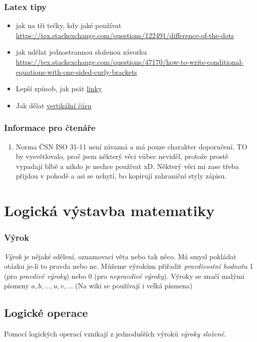 \documentclass[12pt]{article}
\begin{document}
\subsubsection{Latex tipy}
\begin{itemize}
\item jak na tři tečky, kdy jaké používat \url{https://tex.stackexchange.com/questions/122491/difference-of-the-dots}
\item jak udělat jednostrannou složenou závorku \url{https://tex.stackexchange.com/questions/47170/how-to-write-conditional-equations-with-one-sided-curly-brackets}
\item Lepší způsob, jak psát \href{https://www.latex-tutorial.com/tutorials/hyperlinks/}{linky}
\item Jak dělat \href{https://tex.stackexchange.com/questions/498/mid-vertical-bar-vert-lvert-rvert-divides}{vertikální čáru}
\end{itemize}

\subsubsection{Informace pro čtenáře}
\begin{enumerate}
\item Norma ČSN ISO 31-11 není závazná a má pouze charakter doporučení. TO by vysvětlovalo, proč jsem některý věci vůbec neviděl, protože prostě vypadají blbě a nikdo je nechce používat xD. Některý věci mi zase třeba přijdou v pohodě a asi se uchytí, bo kopírují zahraniční styly zápisu.
\end{enumerate}


\section{Logická výstavba matematiky}
\subsubsection{Výrok}
\emph{Výrok} je nějaké sdělení, oznamovací věta nebo tak něco. Má smysl pokládat otázku je-li to pravda nebo ne. Můžeme výrokům přiřadit \emph{pravdivostní hodnotu} 1 (pro \emph{pravdivé výroky}) nebo 0 (pro \emph{nepravdivé výroky}). Výroky se značí malými písmeny $a,b, \dotsc, u,v, \dotsc$ (Na wiki se používají i velká písmena)
\subsection{Logické operace}
Pomocí logických operací vznikají z jednodušších výroků \emph{výroky složené}.
\end{document}
